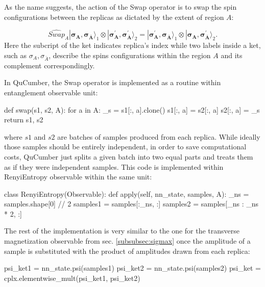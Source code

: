 \documentclass[submission, Phys, hidelnks]{SciPost}
\begin{document}
As the name suggests, the action of the Swap operator is to swap the spin configurations  between the replicas as dictated by the extent of region $A$:

\begin{equation}
  \widehat{Swap}_A |\bm{\sigma_A, \sigma_{\bar A}}\rangle_1 \otimes  |\bm{\sigma^{\prime}_A, \sigma^{\prime}_{\bar A}}\rangle_2 = |\bm{\sigma^{\prime}_A, \sigma_{\bar A}}\rangle_1 \otimes  |\bm{\sigma_A, \sigma^{\prime}_{\bar A}}\rangle_2 .
\end{equation}
Here the subcript of the ket indicates replica's index while two labels inside a ket, such as $\sigma_A, \sigma_{\bar A}$, describe the spins configurations within the region $A$ and its complement correspondingly. 

In QuCumber, the Swap operator is implemented as a routine within entanglement observable unit: 
\begin{python}
def swap(s1, s2, A):
    for a in A:
        _s = s1[:, a].clone()
        s1[:, a] = s2[:, a]
        s2[:, a] = _s
    return s1, s2
\end{python}
where $s1$ and $s2$ are batches of samples produced from each replica. While ideally those samples should be entirely independent, in order to save computational costs, QuCumber just splits a given batch into two equal parts and treats them as if they were independent samples. This code is implemented within RenyiEntropy observable within the same unit:

\begin{python}
class RenyiEntropy(Observable):
    def apply(self, nn_state, samples, A):
        _ns = samples.shape[0] // 2
        samples1 = samples[:_ns, :]
        samples2 = samples[_ns : _ns * 2, :]
\end{python}
The rest of the implementation is very similar to the one for the transverse magnetization observable from sec. \ref{subsubsec:sigmax} once the amplitude of a sample is substituted with the product of amplitudes drawn from each replica:

\begin{python}
psi_ket1 = nn_state.psi(samples1)
psi_ket2 = nn_state.psi(samples2)
psi_ket = cplx.elementwise_mult(psi_ket1, psi_ket2)
\end{python}
\end{document}
